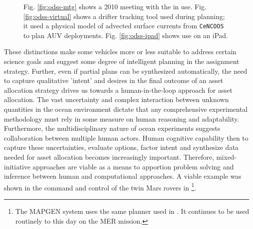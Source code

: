 \begin{figure}
\centering
{}
\caption{\small Fig. \ref{fig:odss-mtg} shows a 2010 \can meeting with
  the \od in use. Fig. \ref{fig:odss-virtual} shows a drifter tracking
  tool used during \can planning; it used a physical model of advected
  surface currents from \texttt{CeNCOOS} \cite{cencoos} to plan AUV
  deployments. Fig. \ref{fig:odss-ipad} shows \od use on an iPad.}
\label{fig:odss2}
\end{figure}


These distinctions make some vehicles more or less suitable to address
certain science goals and suggest some degree of intelligent planning
in the assignment strategy. Further, even if partial plans can be
synthesized automatically, the need to capture qualitative 'intent'
and desires in the final outcome of an asset allocation strategy
drives us towards a human-in-the-loop approach for asset
allocation. The vast uncertainty and complex interaction between
unknown quantities in the ocean environment dictate that any
comprehensive experimental methodology must rely in some measure on
human reasoning and adaptability.  Furthermore, the multidisciplinary
nature of ocean experiments suggests collaboration between multiple
human actors. Human cognitive capability then to capture these
uncertainties, evaluate options, factor intent and synthesize data
needed for asset allocation becomes increasingly important. Therefore,
mixed-initiative approaches are viable as a means to apportion problem
solving and inference between human and computational approaches. A
viable example was shown in the command and control of the twin Mars
rovers in \cite{aichang04,bresina05,bresina05a}\footnote{The MAPGEN
  system uses the same \eu planner used in \rxe. It continues to be
  used routinely to this day on the MER mission.}.

